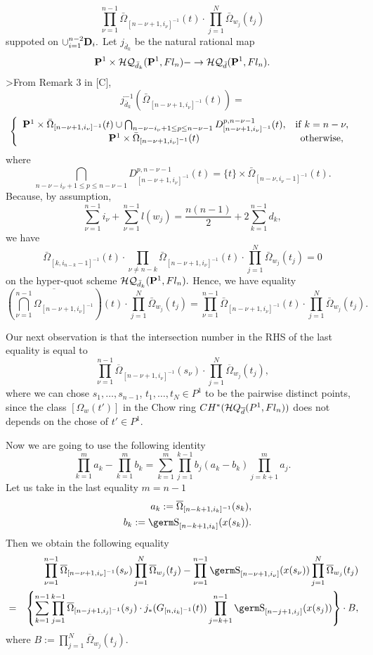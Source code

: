 {{\[ \prod_{\nu =1}^{n-1}
\bar{\Omega}_{[n-\nu +1,i_{\nu}]^{-1}}(t)
\cdot
\prod_{j=1}^{N}\bar{\Omega}_{w_j} (t_j) \]
suppoted on $\cup_{i=1}^{n-2}{\bf D}_i.$ Let $j_{\bar{d}_k}$ be
the natural rational map
\[ {\bf P}^1 \times {\cal HQ}_{\bar{d}_k}
({\bf P}^1,Fl_n) - \rightarrow
{\cal HQ}_{\bar{d}}({\bf P}^1,Fl_n). \]
>From Remark 3 in [C],
\[ j_{\bar{d}_k}^{-1}(\bar{\Omega}_{[n-\nu+1,i_{\nu}]^{-1}}(t)) = \]
\[\left\{
\begin{array}{cc}
{\bf P}^1 \times \bar{\Omega}_{[n-\nu+1,i_{\nu}]^{-1}}(t) \cup
\bigcap_{n-\nu-i_\nu+1\leq p \leq n-\nu-1}
D_{[n-\nu+1,i_{\nu}]^{-1}}^{p,n-\nu-1}(t), & {\rm if} \;
k=n-\nu,
\\
{\bf P}^1 \times \bar{\Omega}_{[n-\nu+1,i_{\nu}]^{-1}}(t) &
{\rm otherwise,}
\end{array}
\right.  \]
where 
\[ \bigcap_{n-\nu-i_\nu+1\leq p \leq n-\nu-1}
D_{[n-\nu+1,i_{\nu}]^{-1}}^{p,n-\nu-1}(t) = 
\{ t\} \times \bar{\Omega}_{[n-\nu,i_{\nu}-1]^{-1}}(t) .\]
Because, by assumption, 
\[\sum_{\nu =1}^{n-1}i_{\nu}+\sum_{\nu =1}^{n-1}l(w_j) 
= \frac{n(n-1)}{2} + 2 \sum_{k=1}^{n-1}d_k, \]
we have 
\[ \bar{\Omega}_{[k,i_{n-k}-1]^{-1}}(t)\cdot 
\prod_{\nu \not= n-k}
\bar{\Omega}_{[n-\nu +1,i_{\nu}]^{-1}}(t)
\cdot
\prod_{j=1}^{N}\bar{\Omega}_{w_j} (t_j)
=0 \] 
on  the hyper-quot scheme ${\cal HQ}_{\bar{d}_k}({\bf P}^1,Fl_n).$ 
Hence, we have equality
\[ \left( \overline{ \bigcap_{\nu =1}^{n-1}
\Omega_{[n-\nu +1,i_{\nu}]^{-1}}} \right) (t) \cdot
\prod_{j=1}^{N}\bar{\Omega}_{w_j}(t_j) =
\prod_{\nu =1}^{n-1}
\bar{\Omega}_{[n-\nu +1,i_{\nu}]^{-1}} (t)
\cdot
\prod_{j=1}^{N}\bar{\Omega}_{w_j} (t_j) . \]

Our next observation is that the intersection number in the RHS of 
the last equality is equal to
$$\prod_{\nu =1}^{n-1}\overline\Omega_{[n-\nu +1,i_{\nu}]^{-1}}(s_{\nu})
\cdot\prod_{j=1}^N\overline\Omega_{w_j}(t_j),
$$
where we can chose $s_1,\ldots ,s_{n-1}$, $t_1,\ldots ,t_N\in P^1$ to be
the pairwise distinct points, since the class $[\Omega_w(t')]$ in the
Chow ring $CH^*({\cal H}Q_{\overline d}(P^1,Fl_n))$ does not depends on 
the chose of $t'\in P^1$. 

Now we are going to use the following identity
$$\prod_{k=1}^ma_k-\prod_{k=1}^mb_k=\sum_{k=1}^m\prod_{j=1}^{k-1}b_j
(a_k-b_k)\prod_{j=k+1}^ma_j.
$$
Let us take in the last equality $m=n-1$
\begin{eqnarray*}
&&a_k:=\overline\Omega_{[n-k+1, i_k]^{-1}}(s_k),\\
&&b_k:=\s_{[n-k+1,i_k]}(x(s_k)).
\end{eqnarray*}
Then we obtain the following equality
\begin{eqnarray*}
& & \prod_{\nu =1}^{n-1}\overline\Omega_{[n-\nu +1,i_{\nu}]^{-1}}(s_{\nu})
\prod_{j=1}^N\overline\Omega_{w_j}(t_j)-\prod_{\nu =1}^{n-1}
\s_{[n-\nu +1,i_{\nu}]}(x(s_{\nu}))\prod_{j=1}^N\overline\Omega_{w_j}(t_j)\\
&=&\left\{\sum_{k=1}^{n-1}\prod_{j=1}^{k-1}\overline\Omega_{[n-j+1,i_j]^{-1}}
(s_j)\cdot j_*(G_{[n,i_k]^{-1}}(t))\prod_{j=k+1}^{n-1}\s_{[n-j+1,i_j]}
(x(s_j))\right\}\cdot B,
\end{eqnarray*}
where $B:=\prod_{j=1}^N\overline\Omega_{w_j}(t_j)$.

}}
